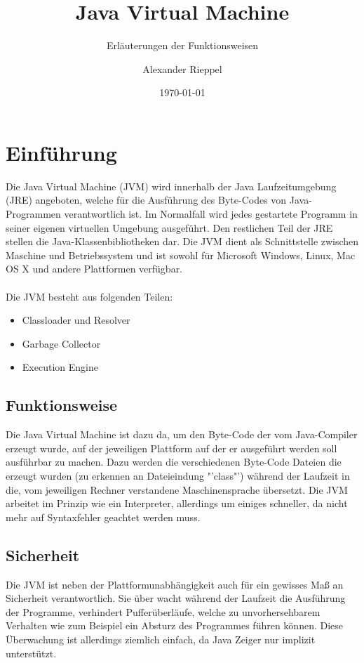 \documentclass[a4paper,14pt]{scrreprt}
\begin{document}
\author{Alexander Rieppel} %
\title{Java Virtual Machine} %
\subject{FT-Ausarbeitung} %
\subtitle{Erläuterungen der Funktionsweisen} %
\date{\today} %
\publishers{5AHITT} %

\maketitle
\tableofcontents
 

\chapter{Einführung}
Die Java Virtual Machine (JVM) wird innerhalb der Java Laufzeitumgebung (JRE) angeboten, welche für die Ausführung des Byte-Codes von Java-Programmen verantwortlich ist. Im Normalfall wird jedes gestartete Programm in seiner eigenen virtuellen Umgebung ausgeführt. Den restlichen Teil der JRE stellen die Java-Klassenbibliotheken dar. Die JVM dient als Schnittstelle zwischen Maschine und Betriebssystem und ist sowohl für Microsoft Windows, Linux, Mac OS X und andere  Plattformen verfügbar. \\\\Die JVM besteht aus folgenden Teilen:
\begin{itemize}
\item Classloader und Resolver
\item Garbage Collector
\item Execution Engine
\end{itemize}
\section{Funktionsweise}
Die Java Virtual Machine ist dazu da, um den Byte-Code der vom Java-Compiler erzeugt wurde, auf der jeweiligen Plattform auf der er ausgeführt werden soll ausführbar zu machen. Dazu werden die verschiedenen Byte-Code Dateien die erzeugt wurden (zu erkennen an Dateieindung "'class"') während der Laufzeit in die, vom jeweiligen Rechner verstandene Maschinensprache übersetzt. Die JVM arbeitet im Prinzip wie ein Interpreter, allerdings um einiges schneller, da nicht mehr auf Syntaxfehler geachtet werden muss. 
\section{Sicherheit}
Die JVM ist neben der Plattformunabhängigkeit auch für ein gewisses Maß an Sicherheit verantwortlich. Sie über wacht während der Laufzeit die Ausführung der Programme, verhindert Pufferüberläufe, welche zu unvorhersehbarem Verhalten wie zum Beispiel ein Absturz des Programmes führen können. Diese Überwachung ist allerdings ziemlich einfach, da Java Zeiger nur implizit unterstützt.
\end{document}
